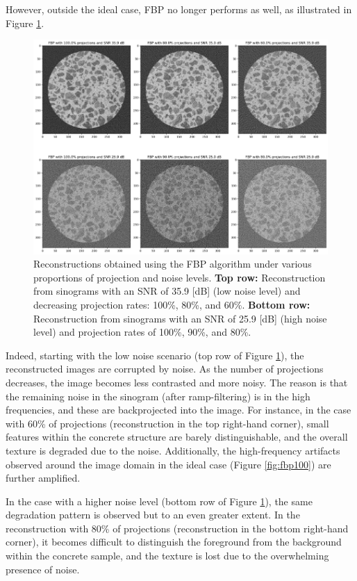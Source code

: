 \documentclass{article}
\begin{document}
However, outside the ideal case, FBP no longer performs as well, as illustrated in Figure \ref{fig:fbp_vary}.
\begin{figure}[H]
    \centering
    \includegraphics[scale=1]{figures/fbp_vary.png}
    \caption{Reconstructions obtained using the FBP algorithm under various proportions of projection and noise levels. \textbf{Top row:} Reconstruction from sinograms  with an SNR of 35.9 [dB] (low noise level)  and decreasing projection rates: 100\%, 80\%, and 60\%. \textbf{Bottom row:} Reconstruction from sinograms with an SNR of 25.9 [dB] (high noise level) and projection rates of 100\%, 90\%, and 80\%. }
    \label{fig:fbp_vary}
\end{figure}

Indeed, starting with the low noise scenario (top row of Figure \ref{fig:fbp_vary}), the reconstructed images are corrupted by noise. As the number of projections decreases, the image becomes less contrasted and more noisy. The reason is that the remaining noise in the sinogram (after ramp-filtering) is in the high frequencies, and these are backprojected into the image. For instance, in the case with 60\% of projections (reconstruction in the top right-hand corner), small features within the concrete structure are barely distinguishable, and the overall texture is degraded due to the noise. Additionally, the high-frequency artifacts observed around the image domain in the ideal case (Figure \ref{fig:fbp100}) are further amplified.
\medskip

In the case with a higher noise level (bottom row of Figure \ref{fig:fbp_vary}), the same degradation pattern is observed but to an even greater extent. In the reconstruction with 80\% of projections (reconstruction in the bottom right-hand corner), it becomes difficult to distinguish the foreground from the background within the concrete sample, and the texture is lost due to the overwhelming presence of noise.
\medskip
\end{document}
